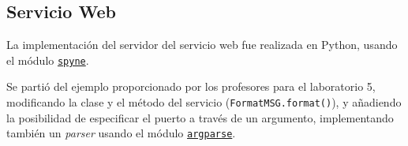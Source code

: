 \subsection{Servicio Web}

La implementación del servidor del servicio web fue realizada en Python, usando el módulo \href{https://pypi.org/project/spyne/}{\texttt{spyne}}.

Se partió del ejemplo proporcionado por los profesores para el laboratorio 5, modificando la clase y el método del servicio (\texttt{FormatMSG.format()}), y añadiendo la posibilidad de especificar el puerto a través de un argumento, implementando también un \textit{parser} usando el módulo \href{https://pypi.org/project/argparse/}{\texttt{argparse}}.